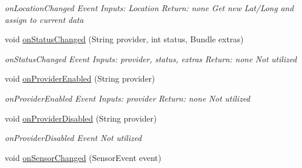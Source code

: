 \begin{DoxyCompactItemize}
\begin{DoxyCompactList}\small\item\em on\+Location\+Changed Event Inputs\+: Location Return\+: none Get new Lat/\+Long and assign to current data \end{DoxyCompactList}\item 
void \hyperlink{classedu_1_1tamu_1_1rfsignalmap_1_1_main_activity_fragment_a7411fbbd5dae612d2e3001fbd77c49a1}{on\+Status\+Changed} (String provider, int status, Bundle extras)\hypertarget{classedu_1_1tamu_1_1rfsignalmap_1_1_main_activity_fragment_a7411fbbd5dae612d2e3001fbd77c49a1}{}\label{classedu_1_1tamu_1_1rfsignalmap_1_1_main_activity_fragment_a7411fbbd5dae612d2e3001fbd77c49a1}

\begin{DoxyCompactList}\small\item\em on\+Status\+Changed Event Inputs\+: provider, status, extras Return\+: none Not utilized \end{DoxyCompactList}\item 
void \hyperlink{classedu_1_1tamu_1_1rfsignalmap_1_1_main_activity_fragment_ab8e1fa6c21df3234f821375db06f61f0}{on\+Provider\+Enabled} (String provider)\hypertarget{classedu_1_1tamu_1_1rfsignalmap_1_1_main_activity_fragment_ab8e1fa6c21df3234f821375db06f61f0}{}\label{classedu_1_1tamu_1_1rfsignalmap_1_1_main_activity_fragment_ab8e1fa6c21df3234f821375db06f61f0}

\begin{DoxyCompactList}\small\item\em on\+Provider\+Enabled Event Inputs\+: provider Return\+: none Not utilized \end{DoxyCompactList}\item 
void \hyperlink{classedu_1_1tamu_1_1rfsignalmap_1_1_main_activity_fragment_a2a14a7d8a421c016c748e275d42cd53c}{on\+Provider\+Disabled} (String provider)\hypertarget{classedu_1_1tamu_1_1rfsignalmap_1_1_main_activity_fragment_a2a14a7d8a421c016c748e275d42cd53c}{}\label{classedu_1_1tamu_1_1rfsignalmap_1_1_main_activity_fragment_a2a14a7d8a421c016c748e275d42cd53c}

\begin{DoxyCompactList}\small\item\em on\+Provider\+Disabled Event Not utilized \end{DoxyCompactList}\item 
void \hyperlink{classedu_1_1tamu_1_1rfsignalmap_1_1_main_activity_fragment_a4f905c00c84ac0280a65907957128156}{on\+Sensor\+Changed} (Sensor\+Event event)\hypertarget{classedu_1_1tamu_1_1rfsignalmap_1_1_main_activity_fragment_a4f905c00c84ac0280a65907957128156}{}\label{classedu_1_1tamu_1_1rfsignalmap_1_1_main_activity_fragment_a4f905c00c84ac0280a65907957128156}


\end{DoxyCompactItemize}
